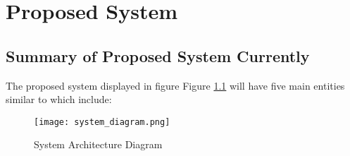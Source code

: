 \chapter{Proposed System}
\label{chap:proposedsystem}


\section{Summary of Proposed System Currently}

The proposed system displayed in figure Figure \ref{systemarchitecture} will have five main entities similar to \cite{Yang2013}\cite{Yang2014} which include:

\begin{figure}
\begin{center}
\texttt{[image: system\_diagram.png]} 
\caption{System Architecture Diagram}
\label{systemarchitecture}
\end{center}
\end{figure}

